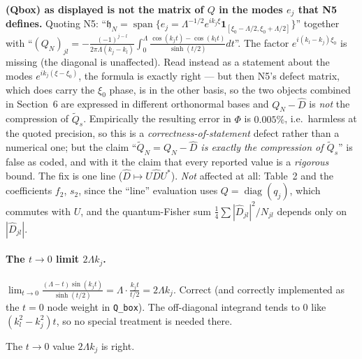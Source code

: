 \documentclass[11pt]{article}
\begin{document}
\begin{verdictgap}
\textbf{(Qbox) as displayed is not the matrix of $Q$ in the modes $e_j$ that N5 defines.}
Quoting N5: ``\emph{$\mathfrak h_N=\operatorname{span}\{e_j=\Lambda^{-1/2}e^{ik_j\xi}
\mathbf 1_{[\xi_0-\Lambda/2,\xi_0+\Lambda/2]}\}$}'' together with ``\emph{$(Q_N)_{jl}
=-\frac{(-1)^{j-l}}{2\pi\Lambda(k_j-k_l)}\int_0^\Lambda\frac{\cos(k_jt)-\cos(k_lt)}{\sinh(t/2)}dt$}''.
The factor $e^{i(k_l-k_j)\xi_0}$ is missing (the diagonal is unaffected).  Read instead as a
statement about the modes $e^{ik_j(\xi-\xi_0)}$, the formula is exactly right --- but then N5's
defect matrix, which does carry the $\xi_0$ phase, is in the other basis, so the two objects
combined in Section~6 are expressed in different orthonormal bases and
$Q_N-\widehat D$ is \emph{not} the compression of $\widetilde Q_s$.  Empirically the resulting
error in $\Phi$ is $0.005\%$, i.e.\ harmless at the quoted precision, so this is a
\emph{correctness-of-statement} defect rather than a numerical one; but the claim ``\emph{$\widetilde
Q_N=Q_N-\widehat D$ is exactly the compression of $\widetilde Q_s$}'' is false as coded, and with
it the claim that every reported value is a \emph{rigorous} bound.  The fix is one line
($\widehat D\mapsto U\widehat D U^*$).  \emph{Not} affected at all: Table~2 and the coefficients
$f_2$, $s_2$, since the ``line'' evaluation uses $Q=\operatorname{diag}(q_j)$, which commutes with
$U$, and the quantum-Fisher sum $\tfrac14\sum|\widehat D_{jl}|^2/N_{jl}$ depends only on
$|\widehat D_{jl}|$.
\end{verdictgap}

\paragraph{The $t\to0$ limit $2\Lambda k_j$.}
$\lim_{t\to0}\frac{(\Lambda-t)\sin(k_jt)}{\sinh(t/2)}=\Lambda\cdot\frac{k_jt}{t/2}=2\Lambda k_j$.
Correct (and correctly implemented as the $t=0$ node weight in \verb|Q_box|).  The off-diagonal
integrand tends to $0$ like $(k_l^2-k_j^2)t$, so no special treatment is needed there.
\begin{verdictok}The $t\to0$ value $2\Lambda k_j$ is right.\end{verdictok}
\end{document}
